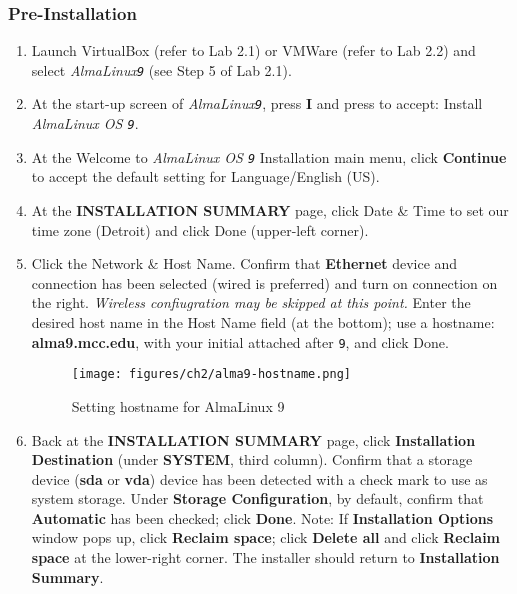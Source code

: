 \subsubsection*{Pre-Installation} 
\begin{enumerate}
\item Launch VirtualBox (refer to Lab 2.1) or VMWare (refer to Lab 2.2) and select {\it{AlmaLinux{\tt{9}}}} (see Step 5 of Lab 2.1).   
\item At the start-up screen of {\it{AlmaLinux{\tt{9}}}}, press {\bf{I}} and press {} to accept: Install {\it{AlmaLinux OS {\tt{9}}}}. 
\item At the Welcome to {\it{AlmaLinux OS {\tt{9}}}} Installation main menu, click {\bf{Continue}} to accept the default setting for Language/English (US). 
\item At the {\bf{INSTALLATION SUMMARY}} page, click Date \& Time to set our time zone (Detroit) and click Done (upper-left corner). 
\item Click the Network \& Host Name. Confirm that {\bf{Ethernet}} device and connection has been selected (wired is preferred) and turn on connection on the right. {\it{Wireless confiugration may be skipped at this point.}} Enter the desired host name in the Host Name field (at the bottom); use a hostname: {\bf{alma9.mcc.edu}}, with your initial attached after {\tt{9}}, and click Done.

\begin{figure}[hbt!]\centering
   \texttt{[image: figures/ch2/alma9-hostname.png]}
   \caption{Setting hostname for AlmaLinux 9} \label{fig:install-alma9-hn} %
\end{figure}

\item Back at the {\bf{INSTALLATION SUMMARY}} page, click {\bf{Installation Destination}} (under {\bf{SYSTEM}}, third column). Confirm that a storage device ({\bf{sda}} or {\bf{vda}}) device has been detected with a check mark to use as system storage. Under {\bf{Storage Configuration}}, by default, confirm that {\bf{Automatic}} has been checked; click {\bf{Done}}. Note: If {\bf{Installation Options}} window pops up, click {\bf{Reclaim space}}; click {\bf{Delete all}} and click {\bf{Reclaim space}} at the lower-right corner. The installer should return to {\bf{Installation Summary}}. 


\end{enumerate}
